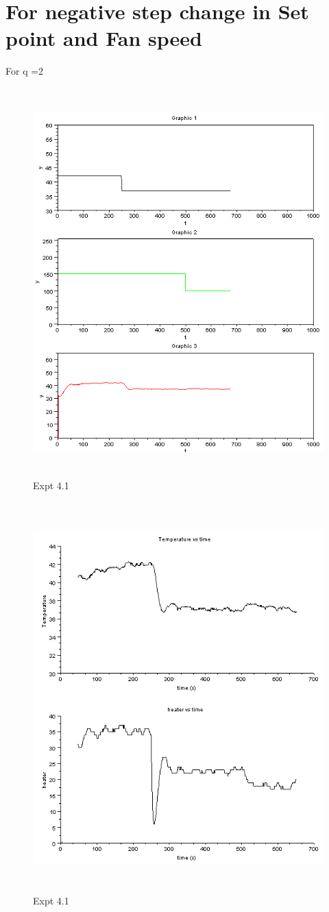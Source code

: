 \section{For negative step change in Set point and Fan speed}
For q =2
\begin{figure}[H]
  \includegraphics[width=12cm, height=15cm]{mpc/4_1.PNG}
  \caption{Expt 4.1}
\end{figure}
\begin{figure}[H]
  \includegraphics[width=12cm, height=15cm]{mpc/4_1_heater_final.png}
  \caption{Expt 4.1}
\end{figure}

